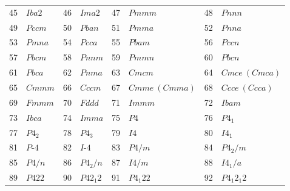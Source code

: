 \documentclass[12pt]{article}
\begin{document}
\begin{center}
{\begin{tabular}{|r|l||r|l||r|l||r|l|}
  45 & $Iba2$                                 &  46 & $Ima2$                                 &  47 & $Pmmm$                                 &  48 & $Pnnn$                                 \\
  49 & $Pccm$                                 &  50 & $Pban$                                 &  51 & $Pmma$                                 &  52 & $Pnna$                                 \\
  53 & $Pmna$                                 &  54 & $Pcca$                                 &  55 & $Pbam$                                 &  56 & $Pccn$                                 \\
  57 & $Pbcm$                                 &  58 & $Pnnm$                                 &  59 & $Pmmn$                                 &  60 & $Pbcn$                                 \\
  61 & $Pbca$                                 &  62 & $Pnma$                                 &  63 & $Cmcm$                                 &  64 & $Cmce\ (Cmca)$\footnotemark[1]         \\
  65 & $Cmmm$                                 &  66 & $Cccm$                                 &  67 & $Cmme\ (Cmma)$\footnotemark[1]         &  68 & $Ccce\ (Ccca)$\footnotemark[1]         \\
  69 & $Fmmm$                                 &  70 & $Fddd$                                 &  71 & $Immm$                                 &  72 & $Ibam$                                 \\
  73 & $Ibca$                                 &  74 & $Imma$                                 &  75 & $P4$                                   &  76 & $P4_{1}$                               \\
  77 & $P4_{2}$                               &  78 & $P4_{3}$                               &  79 & $I4$                                   &  80 & $I4_{1}$                               \\
  81 & $P\mbox{-}4$                           &  82 & $I\mbox{-}4$                           &  83 & $P4/m$                                 &  84 & $P4_{2}/m$                             \\
  85 & $P4/n$                                 &  86 & $P4_{2}/n$                             &  87 & $I4/m$                                 &  88 & $I4_{1}/a$                             \\
  89 & $P422$                                 &  90 & $P42_{1}2$                             &  91 & $P4_{1}22$                             &  92 & $P4_{1}2_{1}2$                         \\

\end{tabular}}
\end{center}
\end{document}

